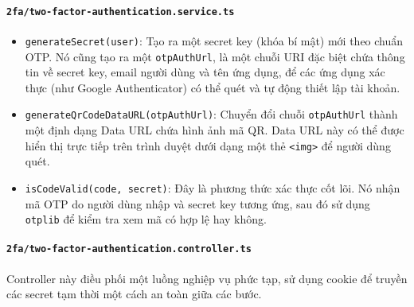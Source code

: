 \paragraph{\texttt{2fa/two-factor-authentication.service.ts}}
\begin{itemize}
    \item \texttt{generateSecret(user)}: Tạo ra một secret key (khóa bí mật) mới theo chuẩn OTP. Nó cũng tạo ra một \texttt{otpAuthUrl}, là một chuỗi URI đặc biệt chứa thông tin về secret key, email người dùng và tên ứng dụng, để các ứng dụng xác thực (như Google Authenticator) có thể quét và tự động thiết lập tài khoản.
    
    \item \texttt{generateQrCodeDataURL(otpAuthUrl)}: Chuyển đổi chuỗi \texttt{otpAuthUrl} thành một định dạng Data URL chứa hình ảnh mã QR. Data URL này có thể được hiển thị trực tiếp trên trình duyệt dưới dạng một thẻ \texttt{<img>} để người dùng quét.
    
    \item \texttt{isCodeValid(code, secret)}: Đây là phương thức xác thực cốt lõi. Nó nhận mã OTP do người dùng nhập và secret key tương ứng, sau đó sử dụng \texttt{otplib} để kiểm tra xem mã có hợp lệ hay không.
\end{itemize}

\paragraph{\texttt{2fa/two-factor-authentication.controller.ts}}
Controller này điều phối một luồng nghiệp vụ phức tạp, sử dụng cookie để truyền các secret tạm thời một cách an toàn giữa các bước.

